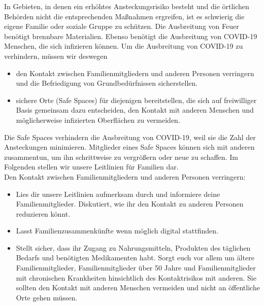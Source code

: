 \documentclass[onecolumn,journal]{IEEEtran}
\begin{document}
\begin{multicols}{2}


In Gebieten, in denen ein erhöhtes Ansteckungsrisiko besteht und die örtlichen Behörden nicht die entsprechenden Maßnahmen ergreifen, ist es schwierig die eigene Familie oder soziale Gruppe zu schützen. Die Ausbreitung von Feuer benötigt brennbare Materialien. Ebenso benötigt die Ausbreitung von COVID-19 Menschen, die sich infizieren können. Um die Ausbreitung von COVID-19 zu verhindern, müssen wir deswegen

\begin{itemize}

\item den Kontakt zwischen Familienmitgliedern und anderen Personen verringern und die Befriedigung von Grundbedürfnissen sicherstellen.

\item sichere Orte (Safe Spaces) für diejenigen bereitstellen, die sich auf freiwilliger Basis gemeinsam dazu entscheiden, den Kontakt mit anderen Menschen und möglicherweise infizierten Oberflächen zu vermeiden.

\end{itemize}

\bigskip

Die Safe Spaces verhindern die Ausbreitung von COVID-19, weil sie die Zahl der Ansteckungen minimieren. Mitglieder eines Safe Spaces können sich mit anderen zusammentun, um ihn schrittweise zu vergrößern oder neue zu schaffen. Im Folgenden stellen wir unsere Leitlinien für Familien dar. \\

Den Kontakt zwischen Familienmitgliedern und anderen Personen verringern:

\begin{itemize}

\item Lies dir unsere Leitlinien aufmerksam durch und informiere deine Familienmitglieder. Diskutiert, wie ihr den Kontakt zu anderen Personen reduzieren könnt.

\item Lasst Familienzusammenkünfte wenn möglich digital stattfinden.

\item Stellt sicher, dass ihr Zugang zu Nahrungsmitteln, Produkten des täglichen Bedarfs und benötigten Medikamenten habt. Sorgt euch vor allem um ältere Familienmitglieder, Familienmitglieder über 50 Jahre und Familienmitglieder mit chronischen Krankheiten hinsichtlich des Kontaktrisikos mit anderen. Sie sollten den Kontakt mit anderen Menschen vermeiden und nicht an öffentliche Orte gehen müssen.


\end{itemize}
\end{multicols}
\end{document}
